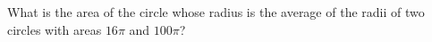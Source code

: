 What is the area of the circle whose radius is the average of the radii of two circles with areas $16\pi$ and $100\pi$?

